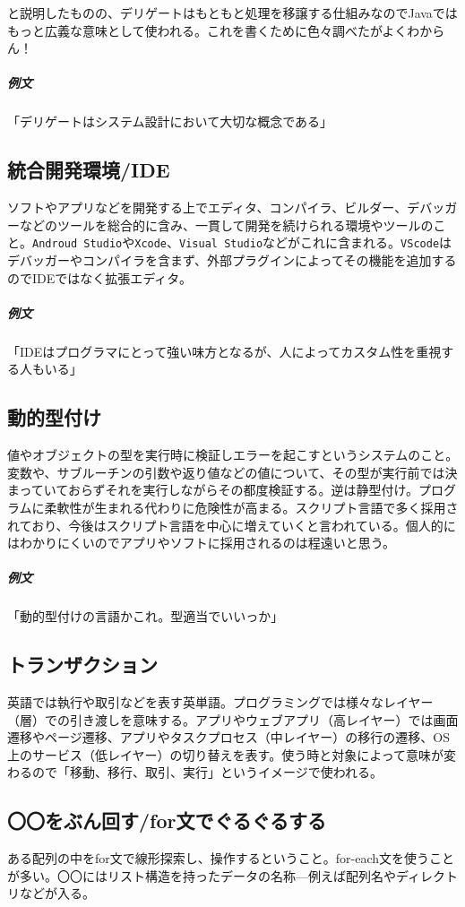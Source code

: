 \documentclass[dvipdfmx,jb5]{jreport}
\newcommand{\terlogy}[2][|]{\colorbox{terlogy}{\texttt{\lstinline#1#2#1}}}
\begin{document}
と説明したものの、デリゲートはもともと処理を移譲する仕組みなのでJavaではもっと広義な意味として使われる。これを書くために色々調べたがよくわからん！

\subparagraph{例文}「デリゲートはシステム設計において大切な概念である」

\subsection{統合開発環境/IDE}
ソフトやアプリなどを開発する上でエディタ、コンパイラ、ビルダー、デバッガーなどのツールを総合的に含み、一貫して開発を続けられる環境やツールのこと。\terlogy{Androud Studio}や\terlogy{Xcode}、\terlogy{Visual Studio}などがこれに含まれる。\terlogy{VScode}はデバッガーやコンパイラを含まず、外部プラグインによってその機能を追加するのでIDEではなく拡張エディタ。

\subparagraph{例文}「IDEはプログラマにとって強い味方となるが、人によってカスタム性を重視する人もいる」

\subsection{動的型付け}
値やオブジェクトの型を実行時に検証しエラーを起こすというシステムのこと。変数や、サブルーチンの引数や返り値などの値について、その型が実行前では決まっていておらずそれを実行しながらその都度検証する。逆は静型付け。プログラムに柔軟性が生まれる代わりに危険性が高まる。スクリプト言語で多く採用されており、今後はスクリプト言語を中心に増えていくと言われている。個人的にはわかりにくいのでアプリやソフトに採用されるのは程遠いと思う。

\subparagraph{例文}「動的型付けの言語かこれ。型適当でいいっか」

\subsection{トランザクション}
英語では執行や取引などを表す英単語。プログラミングでは様々なレイヤー（層）での引き渡しを意味する。アプリやウェブアプリ（高レイヤー）では画面遷移やページ遷移、アプリやタスクプロセス（中レイヤー）の移行の遷移、OS上のサービス（低レイヤー）の切り替えを表す。使う時と対象によって意味が変わるので「移動、移行、取引、実行」というイメージで使われる。

\subsection{〇〇をぶん回す/for文でぐるぐるする}
ある配列の中をfor文で線形探索し、操作するということ。for-each文を使うことが多い。〇〇にはリスト構造を持ったデータの名称---例えば配列名やディレクトリなどが入る。
\end{document}
